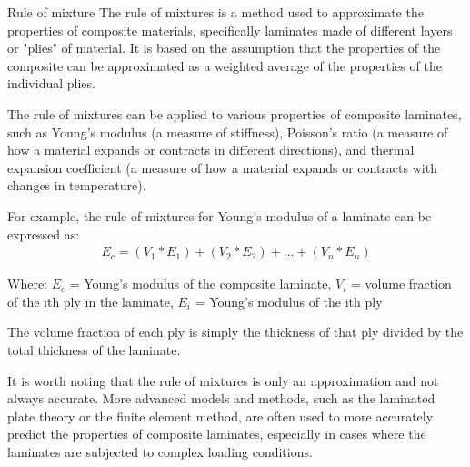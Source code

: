\documentclass[10pt,aspectratio=169,dvipsnames]{beamer} %
\begin{document}
	\begin{frame}{Rule of mixture}
		\justifying\footnotesize
		The rule of mixtures is a method used to approximate the properties of composite materials, specifically laminates made of different layers or "plies" of material. It is based on the assumption that the properties of the composite can be approximated as a weighted average of the properties of the individual plies.
		
		The rule of mixtures can be applied to various properties of composite laminates, such as Young's modulus (a measure of stiffness), Poisson's ratio (a measure of how a material expands or contracts in different directions), and thermal expansion coefficient (a measure of how a material expands or contracts with changes in temperature).
		
		For example, the rule of mixtures for Young's modulus of a laminate can be expressed as:
		\begin{gather*}
			E_c = (V_1 * E_1) + (V_2 * E_2) + ... + (V_n * E_n)
		\end{gather*}
		
		Where:
		\(E_c\) = Young's modulus of the composite laminate, \(V_i\) = volume fraction of the ith ply in the laminate, \(E_i\) = Young's modulus of the ith ply
		
		The volume fraction of each ply is simply the thickness of that ply divided by the total thickness of the laminate.
		
		It is worth noting that the rule of mixtures is only an approximation and not always accurate. More advanced models and methods, such as the laminated plate theory or the finite element method, are often used to more accurately predict the properties of composite laminates, especially in cases where the laminates are subjected to complex loading conditions.	
	\end{frame}
	\setcounter{subfigure}{0}
\end{document}
